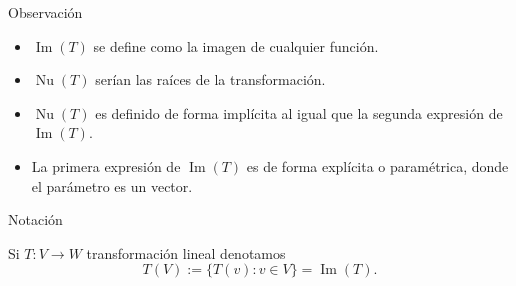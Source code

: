 \documentclass[handout]{beamer} %
\newcommand{\img}{\operatorname{Im}}
\newcommand{\im}{\operatorname{Im}}
\renewcommand\nu{\operatorname{Nu}}
\begin{document}
\begin{frame}

\begin{block}{Observación}
\begin{itemize}\pause
\item $\img(T)$ se define como la imagen de cualquier función. \pause

\item $\nu(T)$ serían las raíces de la transformación. \pause

\item $\nu(T)$ es definido de forma implícita al igual que la segunda expresión de $\img(T)$. \pause

\item La primera expresión de $\img(T)$ es de forma explícita o paramétrica, donde el parámetro es un vector.

\end{itemize}

\begin{block}{Notación}

    Si $T : V \to W$ transformación lineal denotamos
$$
          T(V) := \{T(v): v \in V \} = \im(T).
$$
    
\end{block}
 
\end{block}

\end{frame}

\end{document}
